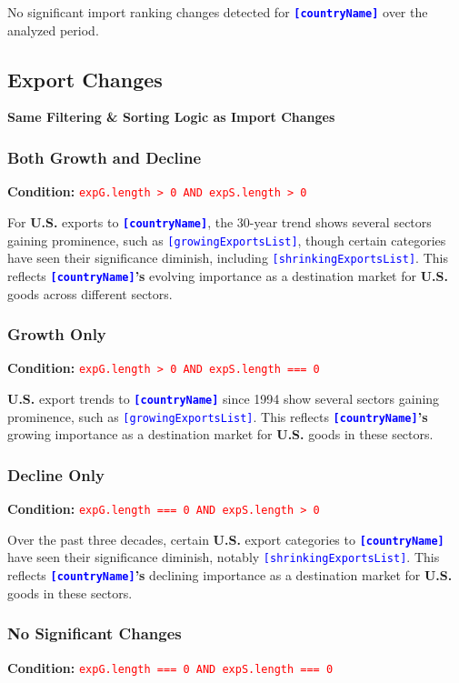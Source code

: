 \documentclass[12pt]{article}
\newcommand{\var}[1]{\textcolor{blue}{\texttt{[#1]}}}
\newcommand{\bold}[1]{\textbf{#1}}
\newcommand{\cond}[1]{\textcolor{red}{\texttt{#1}}}
\begin{document}
No significant import ranking changes detected for \bold{\var{countryName}} over the analyzed period.

\subsection{Export Changes}

\textbf{Same Filtering \& Sorting Logic as Import Changes}

\subsubsection{Both Growth and Decline}
\textbf{Condition:} \cond{expG.length > 0 AND expS.length > 0}

For \bold{U.S.} exports to \bold{\var{countryName}}, the 30-year trend shows several sectors gaining prominence, such as \var{growingExportsList}, though certain categories have seen their significance diminish, including \var{shrinkingExportsList}. This reflects \bold{\var{countryName}'s} evolving importance as a destination market for \bold{U.S.} goods across different sectors.

\subsubsection{Growth Only}
\textbf{Condition:} \cond{expG.length > 0 AND expS.length === 0}

\bold{U.S.} export trends to \bold{\var{countryName}} since 1994 show several sectors gaining prominence, such as \var{growingExportsList}. This reflects \bold{\var{countryName}'s} growing importance as a destination market for \bold{U.S.} goods in these sectors.

\subsubsection{Decline Only}
\textbf{Condition:} \cond{expG.length === 0 AND expS.length > 0}

Over the past three decades, certain \bold{U.S.} export categories to \bold{\var{countryName}} have seen their significance diminish, notably \var{shrinkingExportsList}. This reflects \bold{\var{countryName}'s} declining importance as a destination market for \bold{U.S.} goods in these sectors.

\subsubsection{No Significant Changes}
\textbf{Condition:} \cond{expG.length === 0 AND expS.length === 0}
\end{document}
